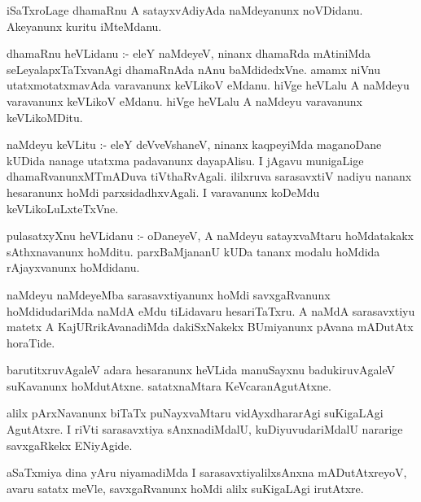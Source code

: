 \documentclass{article}
\begin{document}
\begin{mn}
iSaTxroLage  dhamaRnu  A  satayxvAdiyAda  naMdeyanunx  noVDidanu.  Akeyanunx  kuritu  iMteMdanu.
\end{mn}

\begin{mn}
dhamaRnu  heVLidanu :- eleY  naMdeyeV,  ninanx  dhamaRda  mAtiniMda  seLeyalapxTaTxvanAgi  
dhamaRnAda  nAnu  baMdidedxVne.  amamx  niVnu  utatxmotatxmavAda  varavanunx   
keVLikoV  eMdanu.  hiVge  heVLalu  A  naMdeyu  varavanunx  keVLikoV  eMdanu. 
hiVge  heVLalu  A  naMdeyu  varavanunx  keVLikoMDitu.
\end{mn}

\begin{mn}
naMdeyu  keVLitu :- eleY  deVveVshaneV,  ninanx  kaqpeyiMda  maganoDane  kUDida  
nanage  utatxma padavanunx  dayapAlisu.  I  jAgavu  munigaLige  dhamaRvanunxMTmADuva  
tiVthaRvAgali.  ililxruva  sarasavxtiV  nadiyu  nananx  hesaranunx  hoMdi  
parxsidadhxvAgali.  I varavanunx  koDeMdu  keVLikoLuLxteTxVne.
\end{mn}

\begin{mn}
pulasatxyXnu heVLidanu :- oDaneyeV,  A  naMdeyu  satayxvaMtaru  hoMdatakakx  sAthxnavanunx  
hoMditu.  parxBaMjananU  kUDa  tananx  modalu  hoMdida  rAjayxvanunx  hoMdidanu.
\end{mn}

\begin{mn}
naMdeyu  naMdeyeMba  sarasavxtiyanunx  hoMdi  savxgaRvanunx  hoMdidudariMda  naMdA  
eMdu  tiLidavaru  hesariTaTxru.  A  naMdA  sarasavxtiyu  matetx  A  KajURrikAvanadiMda  
dakiSxNakekx  BUmiyanunx  pAvana  mADutAtx  horaTide.
\end{mn}

\begin{mn}
barutitxruvAgaleV  adara  hesaranunx  heVLida  manuSayxnu  badukiruvAgaleV  suKavanunx  
hoMdutAtxne.  satatxnaMtara  KeVcaranAgutAtxne. 
\end{mn}

\begin{mn}
alilx  pArxNavanunx  biTaTx  puNayxvaMtaru  vidAyxdhararAgi  suKigaLAgi  AgutAtxre.  
I riVti  sarasavxtiya  sAnxnadiMdalU,  kuDiyuvudariMdalU  nararige  savxgaRkekx  ENiyAgide.
\end{mn}

\begin{mn}
aSaTxmiya  dina  yAru  niyamadiMda  I  sarasavxtiyalilxsAnxna mADutAtxreyoV,  
avaru satatx meVle,  savxgaRvanunx  hoMdi alilx  suKigaLAgi  irutAtxre.
\end{mn}
\end{document}
